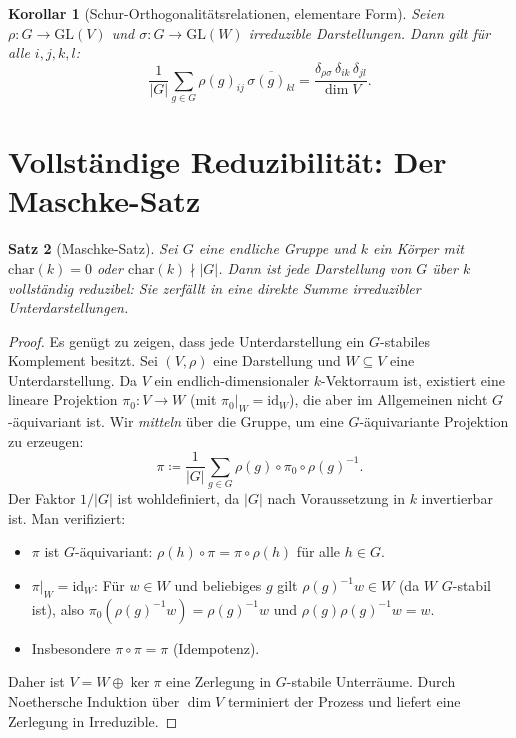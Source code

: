 \documentclass[12pt,a4paper]{amsart}
\newtheorem{theorem}{Satz}[section]
\newtheorem{korollar}[theorem]{Korollar}
\theoremstyle{definition}
\begin{document}
\begin{korollar}[Schur-Orthogonalitätsrelationen, elementare Form]
Seien $\rho \colon G \to \mathrm{GL}(V)$ und $\sigma \colon G \to \mathrm{GL}(W)$
irreduzible Darstellungen.  Dann gilt für alle $i, j, k, l$:
\[
    \frac{1}{|G|} \sum_{g \in G} \rho(g)_{ij}\,\overline{\sigma(g)_{kl}}
    = \frac{\delta_{\rho\sigma}\,\delta_{ik}\,\delta_{jl}}{\dim V}.
\]
\end{korollar}

\section{Vollständige Reduzibilität: Der Maschke-Satz}
\label{sec:maschke}

\begin{theorem}[Maschke-Satz]
\label{satz:maschke}
Sei $G$ eine endliche Gruppe und $k$ ein Körper mit $\mathrm{char}(k) = 0$ oder
$\mathrm{char}(k) \nmid |G|$.  Dann ist jede Darstellung von $G$ über $k$
\emph{vollständig reduzibel}: Sie zerfällt in eine direkte Summe irreduzibler
Unterdarstellungen.
\end{theorem}

\begin{proof}
Es genügt zu zeigen, dass jede Unterdarstellung ein $G$-stabiles Komplement
besitzt.  Sei $(V,\rho)$ eine Darstellung und $W \subseteq V$ eine
Unterdarstellung.  Da $V$ ein endlich-dimensionaler $k$-Vektorraum ist, existiert
eine lineare Projektion $\pi_0 \colon V \to W$ (mit $\pi_0|_W = \mathrm{id}_W$),
die aber im Allgemeinen nicht $G$-äquivariant ist.  Wir \emph{mitteln} über die
Gruppe, um eine $G$-äquivariante Projektion zu erzeugen:
\[
    \pi \coloneqq \frac{1}{|G|} \sum_{g \in G} \rho(g) \circ \pi_0 \circ \rho(g)^{-1}.
\]
Der Faktor $1/|G|$ ist wohldefiniert, da $|G|$ nach Voraussetzung in $k$
invertierbar ist.  Man verifiziert:
\begin{itemize}
  \item $\pi$ ist $G$-äquivariant: $\rho(h) \circ \pi = \pi \circ \rho(h)$ für alle $h \in G$.
  \item $\pi|_W = \mathrm{id}_W$: Für $w \in W$ und beliebiges $g$ gilt
        $\rho(g)^{-1}w \in W$ (da $W$ $G$-stabil ist), also
        $\pi_0(\rho(g)^{-1}w) = \rho(g)^{-1}w$ und $\rho(g)\rho(g)^{-1}w = w$.
  \item Insbesondere $\pi \circ \pi = \pi$ (Idempotenz).
\end{itemize}
Daher ist $V = W \oplus \ker\pi$ eine Zerlegung in $G$-stabile Unterräume.  Durch
Noethersche Induktion über $\dim V$ terminiert der Prozess und liefert eine
Zerlegung in Irreduzible.
\end{proof}
\end{document}
